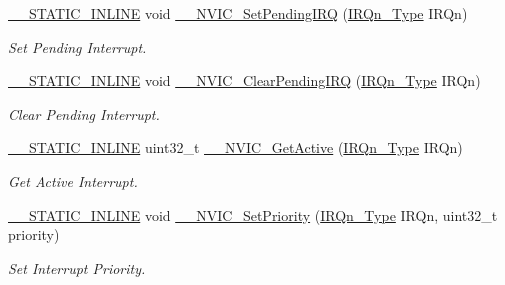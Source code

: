 \begin{DoxyCompactItemize}
\hyperlink{cmsis__iccarm_8h_aba87361bfad2ae52cfe2f40c1a1dbf9c}{\+\_\+\+\_\+\+S\+T\+A\+T\+I\+C\+\_\+\+I\+N\+L\+I\+NE} void \hyperlink{group___c_m_s_i_s___core___n_v_i_c_functions_gaabefdd4b790b9a7308929938c0c1e1ad}{\+\_\+\+\_\+\+N\+V\+I\+C\+\_\+\+Set\+Pending\+I\+RQ} (\hyperlink{group___peripheral__interrupt__number__definition_ga7e1129cd8a196f4284d41db3e82ad5c8}{I\+R\+Qn\+\_\+\+Type} I\+R\+Qn)
\begin{DoxyCompactList}\small\item\em Set Pending Interrupt. \end{DoxyCompactList}\item 
\hyperlink{cmsis__iccarm_8h_aba87361bfad2ae52cfe2f40c1a1dbf9c}{\+\_\+\+\_\+\+S\+T\+A\+T\+I\+C\+\_\+\+I\+N\+L\+I\+NE} void \hyperlink{group___c_m_s_i_s___core___n_v_i_c_functions_ga562a86dbdf14827d0fee8fdafb04d191}{\+\_\+\+\_\+\+N\+V\+I\+C\+\_\+\+Clear\+Pending\+I\+RQ} (\hyperlink{group___peripheral__interrupt__number__definition_ga7e1129cd8a196f4284d41db3e82ad5c8}{I\+R\+Qn\+\_\+\+Type} I\+R\+Qn)
\begin{DoxyCompactList}\small\item\em Clear Pending Interrupt. \end{DoxyCompactList}\item 
\hyperlink{cmsis__iccarm_8h_aba87361bfad2ae52cfe2f40c1a1dbf9c}{\+\_\+\+\_\+\+S\+T\+A\+T\+I\+C\+\_\+\+I\+N\+L\+I\+NE} uint32\+\_\+t \hyperlink{group___c_m_s_i_s___core___n_v_i_c_functions_gaa2837003c28c45abf193fe5e8d27f593}{\+\_\+\+\_\+\+N\+V\+I\+C\+\_\+\+Get\+Active} (\hyperlink{group___peripheral__interrupt__number__definition_ga7e1129cd8a196f4284d41db3e82ad5c8}{I\+R\+Qn\+\_\+\+Type} I\+R\+Qn)
\begin{DoxyCompactList}\small\item\em Get Active Interrupt. \end{DoxyCompactList}\item 
\hyperlink{cmsis__iccarm_8h_aba87361bfad2ae52cfe2f40c1a1dbf9c}{\+\_\+\+\_\+\+S\+T\+A\+T\+I\+C\+\_\+\+I\+N\+L\+I\+NE} void \hyperlink{group___c_m_s_i_s___core___n_v_i_c_functions_ga505338e23563a9c074910fb14e7d45fd}{\+\_\+\+\_\+\+N\+V\+I\+C\+\_\+\+Set\+Priority} (\hyperlink{group___peripheral__interrupt__number__definition_ga7e1129cd8a196f4284d41db3e82ad5c8}{I\+R\+Qn\+\_\+\+Type} I\+R\+Qn, uint32\+\_\+t priority)
\begin{DoxyCompactList}\small\item\em Set Interrupt Priority. \end{DoxyCompactList}\item 

\end{DoxyCompactItemize}
